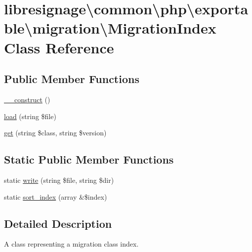 \hypertarget{classlibresignage_1_1common_1_1php_1_1exportable_1_1migration_1_1MigrationIndex}{}\section{libresignage\textbackslash{}common\textbackslash{}php\textbackslash{}exportable\textbackslash{}migration\textbackslash{}Migration\+Index Class Reference}
\label{classlibresignage_1_1common_1_1php_1_1exportable_1_1migration_1_1MigrationIndex}
\subsection*{Public Member Functions}
\begin{DoxyCompactItemize}
\item 
\hyperlink{classlibresignage_1_1common_1_1php_1_1exportable_1_1migration_1_1MigrationIndex_a69281bc35f46a64f826e78654be01621}{\+\_\+\+\_\+construct} ()
\item 
\hyperlink{classlibresignage_1_1common_1_1php_1_1exportable_1_1migration_1_1MigrationIndex_a6c98a176d3de5a895ba2fbd3fa0ff28d}{load} (string \$file)
\item 
\hyperlink{classlibresignage_1_1common_1_1php_1_1exportable_1_1migration_1_1MigrationIndex_aef2dee1cea61f7371ba5610d6465e93f}{get} (string \$class, string \$version)
\end{DoxyCompactItemize}
\subsection*{Static Public Member Functions}
\begin{DoxyCompactItemize}
\item 
static \hyperlink{classlibresignage_1_1common_1_1php_1_1exportable_1_1migration_1_1MigrationIndex_afe20683824d726b46868c6d0e254891a}{write} (string \$file, string \$dir)
\item 
static \hyperlink{classlibresignage_1_1common_1_1php_1_1exportable_1_1migration_1_1MigrationIndex_acd0b16e4362f32fb782a3c202969e38f}{sort\+\_\+index} (array \&\$index)
\end{DoxyCompactItemize}


\subsection{Detailed Description}
A class representing a migration class index. 

